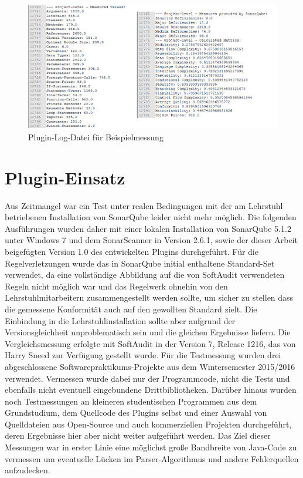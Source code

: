 \documentclass[gb,ngerman]{stthesis}
\begin{document}
			\begin{figure} [h]
				\centering
				\includegraphics [width=\textwidth] {logfile.png}
				\caption{Plugin-Log-Datei für Beispielmessung}
				\label{logfile}
			\end{figure}
	\chapter{Plugin-Einsatz}
		Aus Zeitmangel war ein Test unter realen Bedingungen mit der am Lehrstuhl betriebenen Installation von SonarQube leider nicht mehr möglich. Die folgenden Ausführungen wurden daher mit einer lokalen Installation von SonarQube 5.1.2 unter Windows 7 und dem SonarScanner in Version 2.6.1, sowie der dieser Arbeit beigefügten Version 1.0 des entwickelten Plugins durchgeführt. Für die Regelverletzungen wurde das in SonarQube initial enthaltene Standard-Set verwendet, da eine vollständige Abbildung auf die von SoftAudit verwendeten Regeln nicht möglich war und das Regelwerk ohnehin von den Lehrstuhlmitarbeitern zusammengestellt werden sollte, um sicher zu stellen dass die gemessene Konformität auch auf den gewollten Standard zielt. Die Einbindung in die Lehrstuhlinstallation sollte aber aufgrund der Versionsgleichheit unproblematisch sein und die gleichen Ergebnisse liefern. Die Vergleichsmessung erfolgte mit SoftAudit in der Version 7, Release 1216, das von Harry Sneed zur Verfügung gestellt wurde.\newline
		Für die Testmessung wurden drei abgeschlossene Softwarepraktikums-Projekte aus dem Wintersemester 2015/2016 verwendet. Vermessen wurde dabei nur der Programmcode, nicht die Tests und ebenfalls nicht eventuell eingebundene Drittbibliotheken. Darüber hinaus wurden noch Testmessungen an kleineren studentischen Programmen aus dem Grundstudium, dem Quellcode des Plugins selbst und einer Auswahl von Quelldateien aus Open-Source und auch kommerziellen Projekten durchgeführt, deren Ergebnisse hier aber nicht weiter aufgeführt werden. Das Ziel dieser Messungen war in erster Linie eine möglichst große Bandbreite von Java-Code zu vermessen um eventuelle Lücken im Parser-Algorithmus und andere Fehlerquellen aufzudecken. 
\end{document}
